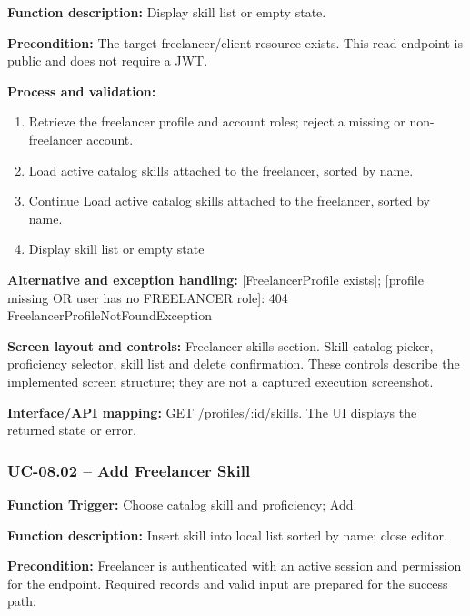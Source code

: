 \textbf{Function description:} Display skill list or empty state.

\textbf{Precondition:} The target freelancer/\allowbreak{}client resource exists. This read endpoint is public and does not require a JWT.

\textbf{Process and validation:}
\begin{enumerate}
\item Retrieve the freelancer profile and account roles; reject a missing or non-freelancer account.
\item Load active catalog skills attached to the freelancer, sorted by name.
\item Continue Load active catalog skills attached to the freelancer, sorted by name.
\item Display skill list or empty state
\end{enumerate}
\textbf{Alternative and exception handling:} [Freelancer\allowbreak{}Profile exists]; [profile missing OR user has no FREELANCER role]: 404 Freelancer\allowbreak{}Profile\allowbreak{}Not\allowbreak{}Found\allowbreak{}Exception

\textbf{Screen layout and controls:} Freelancer skills section. Skill catalog picker, proficiency selector, skill list and delete confirmation. These controls describe the implemented screen structure; they are not a captured execution screenshot.

\textbf{Interface/\allowbreak{}API mapping:} GET /\allowbreak{}profiles/\allowbreak{}:id/\allowbreak{}skills. The UI displays the returned state or error.

\subsubsection{UC-08.02 -- Add Freelancer Skill}
\textbf{Function Trigger:} Choose catalog skill and proficiency; Add.

\textbf{Function description:} Insert skill into local list sorted by name; close editor.

\textbf{Precondition:} Freelancer is authenticated with an active session and permission for the endpoint. Required records and valid input are prepared for the success path.

